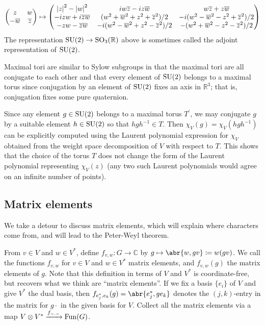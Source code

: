 \documentclass[../../rtnotes.tex]{subfiles}
\begin{document}
\[\begin{pmatrix}
    z & w \\
    -\overline w & \overline z
\end{pmatrix}\mapsto \begin{pmatrix}
    \abs{z}^2-\abs{w}^2 & iw\overline z-iz\overline w & w\overline z + z\overline w\\
    -izw+i\overline z\overline w & (w^2+\overline w^2 + z^2+\overline z^2)/2 & -i(w^2-\overline w^2-z^2+\overline z^2)/2\\
-zw-\overline z\overline w & -i(w^2-\overline w^2+z^2-\overline z^2)/2 & -(w^2+\overline w^2-z^2-\overline z^2)/2\end{pmatrix}\]
The representation $\operatorname{SU}(2)\to \operatorname{SO}_3(\mathbb R)$ above is sometimes called the adjoint representation of $\operatorname{SU}(2)$.

Maximal tori are similar to Sylow subgroups in that the maximal tori are all conjugate to each other and that every element of $\operatorname{SU}(2)$ belongs to a maximal torus since conjugation by an element of $\operatorname{SU}(2)$ fixes an axis in $\mathbb R^3$; that is, conjugation fixes some pure quaternion.

Since any element $g\in \operatorname{SU}(2)$ belongs to a maximal torus $T^\prime$, we may conjugate $g$ by a suitable element $h\in \operatorname{SU}(2)$ so that $hgh^{-1}\in T$. Then $\chi_V(g) = \chi_V(hgh^{-1})$ can be explicitly computed using the Laurent polynomial expression for $\chi_V$ obtained from the weight space decomposition of $V$ with respect to $T$. This shows that the choice of the torus $T$ does not change the form of the Laurent polynomial representing $\chi_V(z)$ (any two such Laurent polynomials would agree on an infinite number of points).

\subsection{Matrix elements}
We take a detour to discuss matrix elements, which will explain where characters come from, and will lead to the Peter-Weyl theorem.

From $v\in V$ and $w\in V^\ast$, define $f_{v,w}\colon G\to \mathbb C$ by $g\mapsto \abr{w,gv}\coloneqq w(gv)$. We call the functions $f_{v,w}$ for $v\in V$ and $w\in V^\ast$ matrix elements, and $f_{v,w}(g)$ the matrix elements of $g$. Note that this definition in terms of $V$ and $V^\ast$ is coordinate-free, but recovers what we think are ``matrix elements''. If we fix a basis $\{e_i\}$ of $V$ and give $V^\ast$ the dual basis, then $f_{e_j^\ast,e_k}(g) = \abr{e_j^\ast,ge_k}$ denotes the $(j,k)$-entry in the matrix for $g\cdot$ in the given basis for $V$. Collect all the matrix elements via a map $V\otimes V^\ast\xrightarrow{f_{-,-}} \operatorname{Fun}(G)$. 
\end{document}
